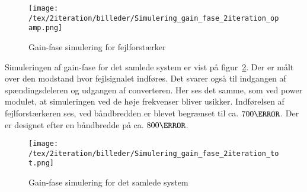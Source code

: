 \begin{figure}[H]
	\center
	\texttt{[image: /tex/2iteration/billeder/Simulering\_gain\_fase\_2iteration\_opamp.png]}
	\caption{Gain-fase simulering for fejlforstærker}
	\label{fig:sim_gain_fase_2iteration_opamp}
\end{figure}


Simuleringen af gain-fase for det samlede system er vist på figur~\ref{fig:sim_gain_fase_2iteration_tot}. Der er målt over den modstand hvor fejlsignalet indføres. Det svarer også til indgangen af spændingsdeleren og udgangen af converteren. Her ses det samme, som ved power modulet, at simuleringen ved de høje frekvenser bliver usikker. Indførelsen af fejlforstærkeren ses, ved båndbredden er blevet begrænset til ca. $700\hertz$. Der er designet efter en båndbredde på ca. $800\hertz$. 

\begin{figure}[H]
	\center
	\texttt{[image: /tex/2iteration/billeder/Simulering\_gain\_fase\_2iteration\_tot.png]}
	\caption{Gain-fase simulering for det samlede system}
	\label{fig:sim_gain_fase_2iteration_tot}
\end{figure}





